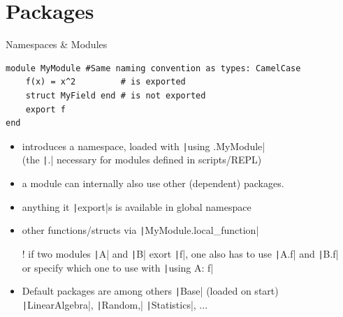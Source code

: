 \documentclass[aspectratio=169, 11pt, handout]{beamer}
\begin{document}
    \section{Packages}
    \begin{frame}[fragile]{Namespaces \& Modules}
        \begin{verbatim}
module MyModule #Same naming convention as types: CamelCase
    f(x) = x^2         # is exported
    struct MyField end # is not exported
    export f
end
        \end{verbatim}
        \begin{itemize}[<+->]
            \item introduces a namespace, loaded with \texttt|using .MyModule|
            \\\hfill{\footnotesize (the \texttt|.| necessary for modules defined in scripts/REPL)}
            \item a module can internally also use other (dependent) packages.
            \item anything it \texttt|export|s is available in \alert{global} namespace
            \item other functions/structs via \texttt|MyModule.local_function|
            \item[!] if two modules \texttt|A| and \texttt|B| exort \texttt|f|, one also has to use
            \texttt|A.f| and \texttt|B.f|
            \\ or specify which one to use with \texttt|using A: f|
            \item Default packages are among others \texttt|Base| (loaded on start)\\
            \texttt|LinearAlgebra|,
            \texttt|Random,|
            \texttt|Statistics|, ...
        \end{itemize}
    \end{frame}
\end{document}
